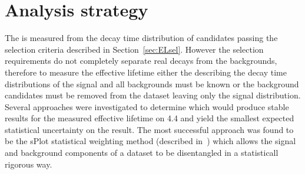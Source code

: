 \section{Analysis strategy}
\label{sec:fitstrategy}


The \bsmumu \el is measured from the decay time distribution of \bsmumu candidates passing the selection criteria described in Section~\ref{sec:ELsel}. However the selection requirements do not completely separate real \bsmumu decays from the backgrounds, therefore to measure the \bsmumu effective lifetime either the \pdfs describing the decay time distributions of the signal and all backgrounds must be known or the background candidates must be removed from the dataset leaving only the signal distribution. Several approaches were investigated to determine which would produce stable results for the measured \bsmumu effective lifetime on 4.4 \fb and yield the smallest expected statistical uncertainty on the result. The most successful approach was found to be the sPlot statistical weighting method (described in~\cite{Pivk:2004ty}) which allows the signal and background components of a dataset to be disentangled in a statisticall rigorous way. %

